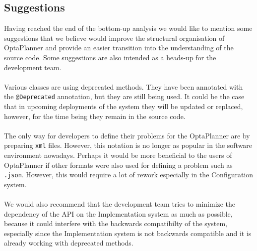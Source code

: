 \subsection{Suggestions}
Having reached the end of the bottom-up analysis we would like to mention some suggestions that we believe would improve the structural organisation of OptaPlanner and provide an easier transition into the understanding of the source code. Some suggestions are also intended as a heads-up for the development team.\\\\
Various classes are using deprecated methods. They have been annotated with the \verb!@Deprecated! annotation, but they are still being used. It could be the case that in upcoming deployments of the system they will be updated or replaced, however, for the time being they remain in the source code.\\\\
The only way for developers to define their problems for the OptaPlanner are by preparing \verb!xml! files. However, this notation is no longer as popular in the software environment nowadays. Perhaps it would be more beneficial to the users of OptaPlanner if other formats were also used for defining a problem such as \verb!.json!. However, this would require a lot of rework especially in the Configuration system.\\\\
We would also recommend that the development team tries to minimize the dependency of the API on the Implementation system as much as possible, because it could interfere with the backwards compatibilty of the system, especially since the Implementation system is not backwards compatible and it is already working with deprecated methods.